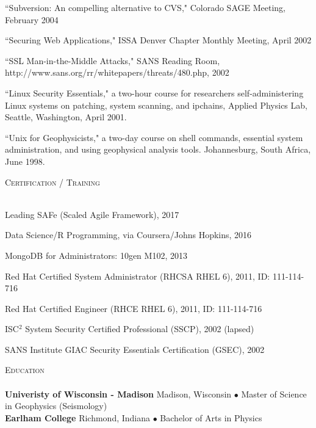 \documentclass{article}
\newcommand{\lineunder}{\vspace*{-8pt} \\ \hspace*{-18pt} \hrulefill \\}
\newcommand{\header}[1]{{\hspace*{-15pt}\vspace*{6pt} \textsc{#1}} \vspace*{-6pt} \lineunder}
\newenvironment{achievements}{\begin{list}{\topsep 0pt \itemsep -2pt}} {\vspace*{4pt}\end{list}}
\newcommand{\school}[3]{
 \textbf{#1} #2 $\bullet$ #3\\
}
\begin{document}
\begin{achievements}
\item ``Subversion: An compelling alternative to CVS," Colorado SAGE Meeting, February 2004
\item ``Securing Web Applications," ISSA Denver Chapter Monthly Meeting, April 2002
\item ``SSL Man-in-the-Middle Attacks," SANS Reading Room, http://www.sans.org/rr/whitepapers/threats/480.php, 2002
\item ``Linux Security Essentials," a two-hour course for researchers self-administering Linux systems on patching, system scanning, and ipchains,  Applied Physics Lab, Seattle, Washington, April 2001.
\item ``Unix for Geophysicists," a two-day course on shell commands, essential system administration, and using geophysical analysis tools.  Johannesburg, South Africa, June 1998.
\end{achievements}


\header{Certification / Training}
\begin{achievements}
\item Leading SAFe (Scaled Agile Framework), 2017
\item Data Science/R Programming, via Coursera/Johns Hopkins, 2016
\item MongoDB for Administrators: 10gen M102, 2013
\item Red Hat Certified System Administrator (RHCSA RHEL 6), 2011, ID: 111-114-716
\item Red Hat Certified Engineer (RHCE RHEL 6), 2011, ID: 111-114-716
\item ISC$^{2}$ System Security Certified Professional (SSCP), 2002 (lapsed)
\item SANS Institute GIAC Security Essentials Certification (GSEC), 2002
\end{achievements}

\header{Education}

\school{Univeristy of Wisconsin - Madison}{Madison, Wisconsin} {Master of Science in Geophysics (Seismology)}
\school{Earlham College}{Richmond, Indiana}{Bachelor of Arts in Physics}
\vspace{18pt}
\end{document}
